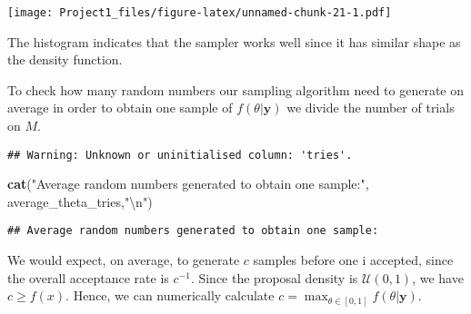 \documentclass[]{article}
\newenvironment{Shaded}{\begin{snugshade}}{\end{snugshade}}
\newcommand{\CharTok}[1]{\textcolor[rgb]{0.31,0.60,0.02}{#1}}
\newcommand{\DataTypeTok}[1]{\textcolor[rgb]{0.13,0.29,0.53}{#1}}
\newcommand{\DecValTok}[1]{\textcolor[rgb]{0.00,0.00,0.81}{#1}}
\newcommand{\KeywordTok}[1]{\textcolor[rgb]{0.13,0.29,0.53}{\textbf{#1}}}
\newcommand{\NormalTok}[1]{#1}
\newcommand{\OperatorTok}[1]{\textcolor[rgb]{0.81,0.36,0.00}{\textbf{#1}}}
\newcommand{\OtherTok}[1]{\textcolor[rgb]{0.56,0.35,0.01}{#1}}
\newcommand{\StringTok}[1]{\textcolor[rgb]{0.31,0.60,0.02}{#1}}
\begin{document}
\texttt{[image: Project1\_files/figure-latex/unnamed-chunk-21-1.pdf]}

The histogram indicates that the sampler works well since it has similar
shape as the density function.

To check how many random numbers our sampling algorithm need to generate
on average in order to obtain one sample of \(f(\theta|\textbf{y})\) we
divide the number of trials on \(M\).

\begin{Shaded}
\end{Shaded}

\begin{verbatim}
## Warning: Unknown or uninitialised column: 'tries'.
\end{verbatim}

\begin{Shaded}
\begin{Highlighting}[]
\KeywordTok{cat}\NormalTok{(}\StringTok{"Average random numbers generated to obtain one sample:"}\NormalTok{, average_theta_tries,}\StringTok{"}\CharTok{\textbackslash{}n}\StringTok{"}\NormalTok{)}
\end{Highlighting}
\end{Shaded}

\begin{verbatim}
## Average random numbers generated to obtain one sample:
\end{verbatim}

We would expect, on average, to generate \(c\) samples before one i
accepted, since the overall acceptance rate is \(c^{-1}\). Since the
proposal density is \(\mathcal{U}(0, 1)\), we have \(c\geq f(x)\).
Hence, we can numerically calculate
\(c = \max_{\theta \in [0, 1]} f(\theta | \textbf{y})\).

\begin{Shaded}
\end{Shaded}
\end{document}
